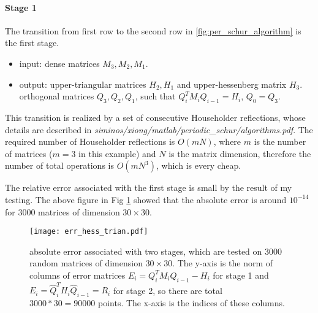 		\paragraph{Stage 1}
		The transition from first row to the second row in \ref{fig:per_schur_algorithm} is the first stage.
		\begin{itemize}
			\item input: dense matrices $M_{3},M_{2},M_{1}$.
			\item output: upper-triangular matrices  $H_{2},H_{1}$ and upper-hessenberg matrix $H_{3}$.\\
					orthogonal matrices $Q_{3},Q_{2},Q_{1}$, such that $Q^{T}_{i}M_{i}Q_{i-1}=H_{i}$,
					$Q_{0}=Q_{3}$.
		\end{itemize}
		This transition is realized by a set of consecutive Householder reflections, whose details are described in
		\textit{siminos/xiong/matlab/periodic\_schur/algorithms.pdf}. The required number of Householder reflections
		is $O(mN)$, where $m$ is the number of matrices ($m=3$ in this example) and $N$ is the matrix dimension,
		therefore the number of total operations is $O(mN^{3})$, which is every cheap.

		The relative error associated with the first stage is small by the result of my testing. The above figure in
		Fig \ref{fig:err_hess_trian} showed that the absolute error is around $10^{-14}$ for 3000 matrices of
		dimension $30\times 30$.
		\begin{figure}[h]
			\centering
			\texttt{[image: err\_hess\_trian.pdf]}
			\caption{absolute error associated with two stages, which are tested on 3000 random matrices of
			dimension $30\times 30$. The y-axis is the norm of columns of error matrices
			$E_{i}=Q^{T}_{i}M_{i}Q_{i-1}-H_{i}$ for stage 1 and $E_{i}=\hat{Q}^{T}_{i}H_{i}\hat{Q}_{i-1}=R_{i}$
			for stage 2, so there are total $3000*30=90000$ points. The x-axis is the indices
			of these columns.
			}
			\label{fig:err_hess_trian}
		\end{figure}

